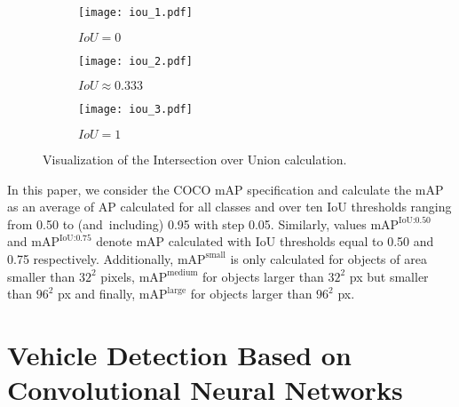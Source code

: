 \begin{figure}[h]
    \centering
    \begin{subfigure}[b]{0.3125\textwidth}
        \texttt{[image: iou\_1.pdf]}
        \caption{$IoU = 0$}
    \end{subfigure}
    \hfill
    \begin{subfigure}[b]{0.2272727\textwidth}
        \texttt{[image: iou\_2.pdf]}
        \caption{$IoU \approx 0.333$}
    \end{subfigure}
    \hfill
    \begin{subfigure}[b]{0.15151515\textwidth}
        \texttt{[image: iou\_3.pdf]}
        \caption{$IoU = 1$}
    \end{subfigure}

    \caption{Visualization of the Intersection over Union calculation.}
    \label{IoU}
\end{figure}

In this paper, we consider the COCO mAP specification and calculate the mAP as
an average of AP calculated for all classes and over ten IoU thresholds ranging
from \num{0.50} to (and~including) \num{0.95} with step \num{0.05}. Similarly,
values $\text{mAP}^{\text{IoU:0.50}}$ and $\text{mAP}^{\text{IoU:0.75}}$ denote
mAP calculated with IoU thresholds equal to \num{0.50} and \num{0.75}
respectively. Additionally, $\text{mAP}^{\text{small}}$ is only calculated for
objects of area smaller than $32^2$ pixels, $\text{mAP}^{\text{medium}}$ for
objects larger than $32^2$ px but smaller than $96^2$ px and finally,
$\text{mAP}^{\text{large}}$ for objects larger than $96^2$ px.




\section{Vehicle Detection Based on Convolutional Neural Networks}


